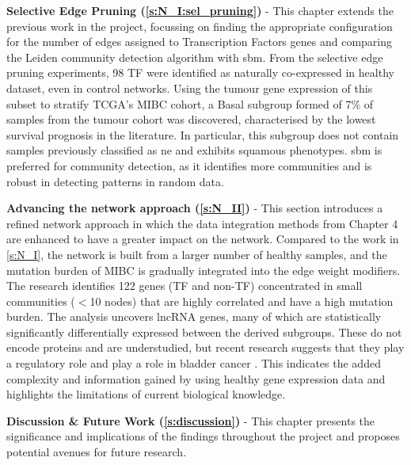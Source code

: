 \textbf{Selective Edge Pruning (\cref{s:N_I:sel_pruning})} - This chapter extends the previous work in the project, focussing on finding the appropriate configuration for the number of edges assigned to Transcription Factors genes and comparing the Leiden community detection algorithm with \acrfull{sbm}. From the selective edge pruning experiments, 98 TF were identified as naturally co-expressed in healthy dataset, even in control networks. Using the tumour gene expression of this subset to stratify TCGA's MIBC cohort, a Basal subgroup formed of 7\% of samples from the tumour cohort was discovered, characterised by the lowest survival prognosis in the literature. In particular, this subgroup does not contain samples previously classified as \acrlong{ne} and exhibits squamous phenotypes. \acrshort{sbm} is preferred for community detection, as it identifies more communities and is robust in detecting patterns in random data.

\textbf{Advancing the network approach (\cref{s:N_II})} - This section introduces a refined network approach in which the data integration methods from Chapter 4 are enhanced to have a greater impact on the network. Compared to the work in \cref{s:N_I}, the network is built from a larger number of healthy samples, and the mutation burden of MIBC is gradually integrated into the edge weight modifiers. The research identifies 122 genes (TF and non-TF) concentrated in small communities (\(<\)10 nodes) that are highly correlated and have a high mutation burden. The analysis uncovers \acrlong{lncRNA} genes, many of which are statistically significantly differentially expressed between the derived subgroups. These do not encode proteins and are understudied, but recent research suggests that they play a regulatory role \citep{Statello2021-md} and play a role in bladder cancer \citep{Zhan2018-um,Logotheti2020-ya}. This indicates the added complexity and information gained by using healthy gene expression data and highlights the limitations of current biological knowledge.

\textbf{Discussion \& Future Work (\cref{s:discussion})} - This chapter presents the significance and implications of the findings throughout the project and proposes potential avenues for future research.




